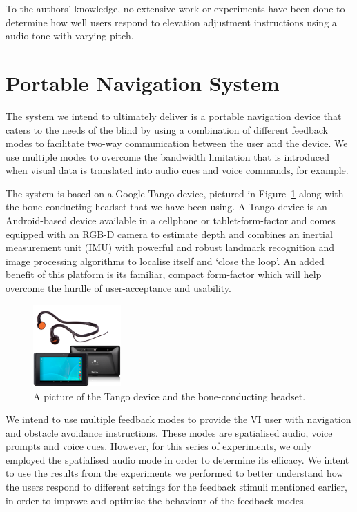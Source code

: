 \documentclass[format=sigconf, review=true, screen=true, anonymous=true]{acmart}
\begin{document}
To the authors' knowledge, no extensive work or experiments have been done to determine how well users respond to elevation adjustment instructions using a audio tone with varying pitch. 

\section{Portable Navigation System}

The system we intend to ultimately deliver is a portable navigation device that caters to the needs of the blind by using a combination of different feedback modes to facilitate two-way communication between the user and the device. We use multiple modes to overcome the bandwidth limitation that is introduced when visual data is translated into audio cues and voice commands, for example. 

The system is based on a Google Tango device, pictured in Figure~\ref{fig:tango} along with the bone-conducting headset that we have been using. A Tango device is an Android-based device available in a cellphone or tablet-form-factor and comes equipped with an RGB-D camera to estimate depth and combines an inertial measurement unit (IMU) with powerful and robust landmark recognition and image processing algorithms to localise itself and `close the loop'. An added benefit of this platform is its familiar, compact form-factor which will help overcome the hurdle of user-acceptance and usability. 

\begin{figure}
  \centering
  \includegraphics[width=0.3\textwidth]{figures/tango_headphone.png}
  \caption{A picture of the Tango device and the bone-conducting headset.}
  \label{fig:tango}
\end{figure}

We intend to use multiple feedback modes to provide the VI user with navigation and obstacle avoidance instructions. These modes are spatialised audio, voice prompts and voice cues. However, for this series of experiments, we only employed the spatialised audio mode in order to determine its efficacy. We intent to use the results from the experiments we performed to better understand how the users respond to different settings for the feedback stimuli mentioned earlier, in order to improve and optimise the behaviour of the feedback modes. 
\end{document}
